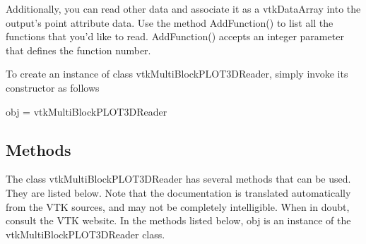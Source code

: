 Additionally, you can read other data and associate it as a vtk\-Data\-Array into the output's point attribute data. Use the method Add\-Function() to list all the functions that you'd like to read. Add\-Function() accepts an integer parameter that defines the function number.

To create an instance of class vtk\-Multi\-Block\-P\-L\-O\-T3\-D\-Reader, simply invoke its constructor as follows \begin{DoxyVerb}  obj = vtkMultiBlockPLOT3DReader
\end{DoxyVerb}
 \hypertarget{vtkwidgets_vtkxyplotwidget_Methods}{}\subsection{Methods}\label{vtkwidgets_vtkxyplotwidget_Methods}
The class vtk\-Multi\-Block\-P\-L\-O\-T3\-D\-Reader has several methods that can be used. They are listed below. Note that the documentation is translated automatically from the V\-T\-K sources, and may not be completely intelligible. When in doubt, consult the V\-T\-K website. In the methods listed below, {\ttfamily obj} is an instance of the vtk\-Multi\-Block\-P\-L\-O\-T3\-D\-Reader class. 
